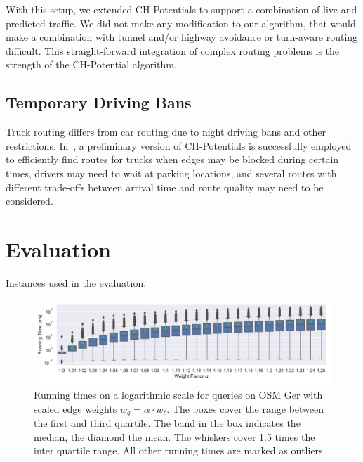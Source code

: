 \documentclass[letterpaper]{article} %
\begin{document}
With this setup, we extended CH-Potentials to support a combination of live and predicted traffic.
We did not make any modification to our algorithm, that would make a combination with tunnel and/or highway avoidance or turn-aware routing difficult.
This straight-forward integration of complex routing problems is the strength of the CH-Potential algorithm.

\subsection{Temporary Driving Bans}

Truck routing differs from car routing due to night driving bans and other restrictions.
In~\cite{kswz-erptd-20}, a preliminary version of CH-Potentials is successfully employed to efficiently find routes for trucks when edges may be blocked during certain times, drivers may need to wait at parking locations, and several routes with different trade-offs between arrival time and route quality may need to be considered.

\section{Evaluation}

\label{sec:experiments}

\begin{table}
\centering
\caption{Instances used in the evaluation.}\label{tab:graphs}

\end{table}

\begin{figure}
\centering
\includegraphics[width=\textwidth]{fig/scaled_weights.pdf}
\caption{
Running times on a logarithmic scale for queries on OSM Ger with scaled edge weights $w_q = \alpha \cdot w_\ell$.
The boxes cover the range between the first and third quartile.
The band in the box indicates the median, the diamond the mean.
The whiskers cover 1.5 times the inter quartile range.
All other running times are marked as outliers.
}\label{fig:scaled_weights}
\end{figure}
\end{document}
